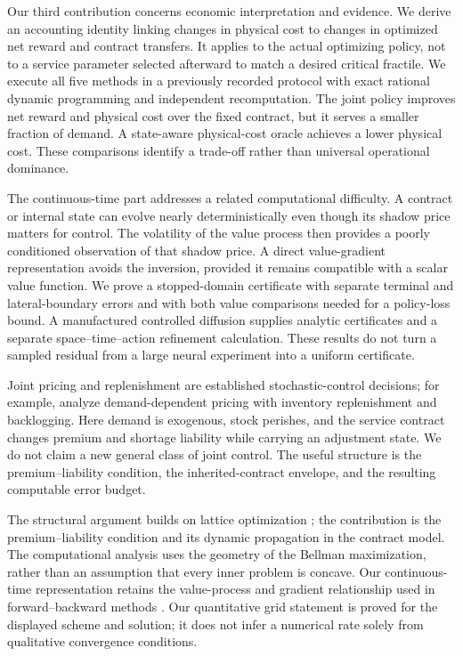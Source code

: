 \documentclass[11pt,letterpaper]{article}
\theoremstyle{definition}
\newcommand{\1}{\mathbf 1}
\begin{document}
Our third contribution concerns economic interpretation and evidence. We derive an accounting identity linking changes in physical cost to changes in optimized net reward and contract transfers. It applies to the actual optimizing policy, not to a service parameter selected afterward to match a desired critical fractile. We execute all five methods in a previously recorded protocol with exact rational dynamic programming and independent recomputation. The joint policy improves net reward and physical cost over the fixed contract, but it serves a smaller fraction of demand. A state-aware physical-cost oracle achieves a lower physical cost. These comparisons identify a trade-off rather than universal operational dominance.

The continuous-time part addresses a related computational difficulty. A contract or internal state can evolve nearly deterministically even though its shadow price matters for control. The volatility of the value process then provides a poorly conditioned observation of that shadow price. A direct value-gradient representation avoids the inversion, provided it remains compatible with a scalar value function. We prove a stopped-domain certificate with separate terminal and lateral-boundary errors and with both value comparisons needed for a policy-loss bound. A manufactured controlled diffusion supplies analytic certificates and a separate space--time--action refinement calculation. These results do not turn a sampled residual from a large neural experiment into a uniform certificate.

Joint pricing and replenishment are established stochastic-control decisions; for example, \citet{FedergruenHeching1999} analyze demand-dependent pricing with inventory replenishment and backlogging. Here demand is exogenous, stock perishes, and the service contract changes premium and shortage liability while carrying an adjustment state. We do not claim a new general class of joint control. The useful structure is the premium--liability condition, the inherited-contract envelope, and the resulting computable error budget.

The structural argument builds on lattice optimization \citep{Topkis1978}; the contribution is the premium--liability condition and its dynamic propagation in the contract model. The computational analysis uses the geometry of the Bellman maximization, rather than an assumption that every inner problem is concave. Our continuous-time representation retains the value-process and gradient relationship used in forward--backward methods \citep{MaProtterYong1994,HanJentzenE2018}. Our quantitative grid statement is proved for the displayed scheme and solution; it does not infer a numerical rate solely from qualitative convergence conditions.





\end{document}
